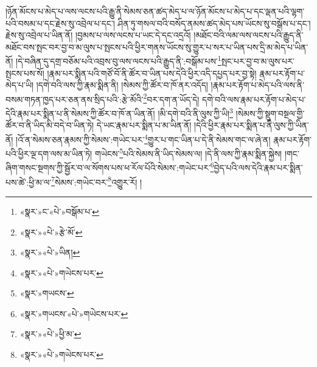 །ཉོན་མོངས་པ་མེད་པ་ལས་ལངས་པའི་རྒྱུ་ནི་སེམས་ཅན་ཚད་མེད་པ་ལ་ཉོན་མོངས་པ་མེད་པ་དང་ལྡན་པའི་ལྷག་པའི་བསམ་པ་དང་རྗེས་སུ་འབྲེལ་པ་དང་། ཤིན་ཏུ་གསལ་བའི་བསོད་ནམས་ཚད་མེད་པས་ཡོངས་སུ་བསྒོས་པ་དང་། རྗེས་སུ་འབྲེལ་པ་ཡིན་ནོ། །བྱམས་པ་ལས་ལངས་པ་ཡང་དེ་དང་འདྲའོ། །མཐོང་བའི་ལམ་ལས་ལངས་པའི་རྒྱུད་ནི་མཐོང་བས་སྤང་བར་བྱ་བ་མ་ལུས་པ་སྤངས་པའི་ཕྱིར་གནས་ཡོངས་སུ་གྱུར་པ་སར་པ་ཡིན་པས་དྲི་མ་མེད་པ་ཡིན་ནོ། །དེ་བཞིན་དུ་དགྲ་བཅོམ་པའི་འབྲས་བུ་ལས་ལངས་པའི་རྒྱུད་ནི་:བསྒོམ་པས་\footnote{«སྣར་»ང་«པེ་»བསྒོམ་པ་}སྤང་པར་བྱ་བ་མ་ལུས་པར་སྤངས་པས་སོ། །རྣམ་པར་སྨིན་པའི་གཙོ་བོ་ནི་ཚོར་བ་ཡིན་པས་དེའི་ཕྱིར་འདི་དཔྱད་པར་བྱ་སྟེ། རྣམ་པར་རྟོག་པ་མེད་པ་ཡི། །དགེ་བའི་ལས་ཀྱི་རྣམ་སྨིན་ནི། །སེམས་ཀྱི་ཚོར་བ་ཁོ་ནར་འདོད། །རྣམ་པར་རྟོག་པ་མེད་པའི་ལས་ནི་བསམ་གཏན་ཁྱད་པར་ཅན་ནས་སྲིད་པའི་:རྩེ་མོའི་\footnote{«སྣར་»«པེ་»རྩེ་མོ་}བར་དག་ན་ཡོད་དེ། དགེ་བའི་ལས་རྣམ་པར་རྟོག་པ་མེད་པ་དེའི་རྣམ་པར་སྨིན་པ་ནི་སེམས་ཀྱི་ཚོར་བ་ཁོ་ན་ཡིན་ནོ། །མི་དགེ་བའི་ནི་ལུས་ཀྱི་ཡི།\footnote{«སྣར་»«པེ་»ཡིན།} །སེམས་ཀྱི་སྡུག་བསྔལ་གྱི་ཚོར་བ་ནི་ཡིད་མི་བདེ་བ་ཡིན་ཏེ། དེ་ཡང་རྣམ་པར་སྨིན་པ་མ་ཡིན་ནོ། །དེའི་ཕྱིར་རྣམ་པར་སྨིན་པ་ནི་ལུས་ཀྱི་ཡིན་ནོ། །འོ་ན་སེམས་ཅན་རྣམས་ཀྱི་སེམས་:གཡེང་པར་\footnote{«སྣར་»«པེ་»གཡེངས་པར་}གྱུར་པ་གང་ཡིན་པ་དེ་ནི་སེམས་གང་ལ་ཞེ་ན། རྣམ་པར་རྟོག་པའི་ཕྱིར་ལྔ་དག་ལས་མ་ཡིན་ཏེ། གཡེངས་\footnote{«སྣར་»གཡངས་}པའི་སེམས་ནི་ཡིད་སེམས་ལ། །དེ་ནི་ལས་ཀྱི་རྣམ་སྨིན་སྐྱེས། །གང་ཞིག་གསང་སྔགས་ཀྱི་སྦྱོར་བ་ལ་སོགས་པས་ཕ་རོལ་པོའི་སེམས་:གཡེང་པར་\footnote{«སྣར་»གཡངས་«པེ་»གཡེངས་པར་}བྱེད་པའི་ལས་དེའི་རྣམ་པར་སྨིན་པས་ཚེ་:ཕྱི་མ་ལ་\footnote{«སྣར་»«པེ་»ཕྱི་མ་}སེམས་:གཡེང་བར་\footnote{«སྣར་»«པེ་»གཡེངས་པར་}འགྱུར་རོ། །

